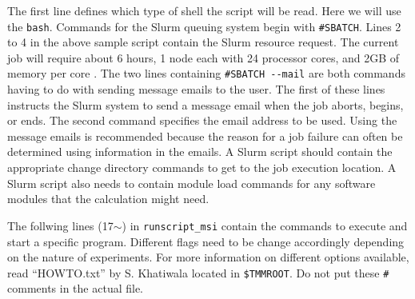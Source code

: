 \documentclass[a4paper]{article}
\def\noin{\noindent }
\begin{document}
\noin The first line defines which type of shell the script will be read. Here we will use the \verb|bash|. Commands for the Slurm queuing system begin with \verb|#SBATCH|. Lines 2 to 4 in the above sample script contain the Slurm resource request. The current job will require about 6 hours, 1 node each with 24 processor cores, and 2GB of memory per core . The two lines containing \verb|#SBATCH --mail| are both commands having to do with sending message emails to the user. The first of these lines instructs the Slurm system to send a message email when the job aborts, begins, or ends. The second command specifies the email address to be used. Using the message emails is recommended because the reason for a job failure can often be determined using information in the emails. A Slurm script should contain the appropriate change directory commands to get to the job execution location. A Slurm script also needs to contain module load commands for any software modules that the calculation might need. 

The follwing lines (17$\sim$) in \verb|runscript_msi| contain the commands to execute and start a specific program. Different flags need to be change accordingly depending on the nature of experiments. For more information on different options available, read ``HOWTO.txt'' by S. Khatiwala located in \verb|$TMMROOT|. Do not put these  \verb|#| comments in the actual file. 
\end{document}
